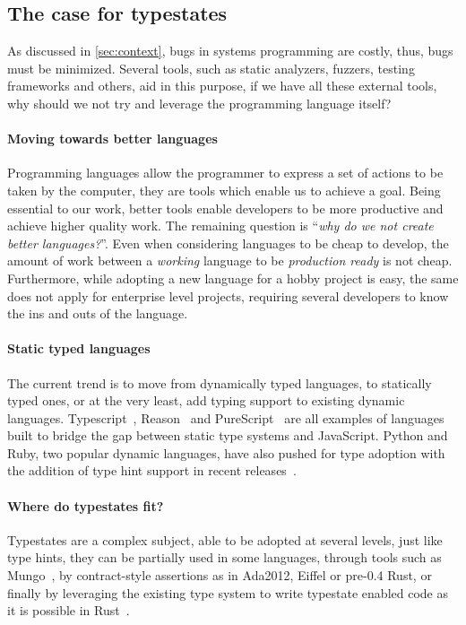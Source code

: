 \subsection{The case for typestates}

As discussed in \autoref{sec:context}, bugs in systems programming are costly,
thus, bugs must be minimized.
Several tools, such as static analyzers, fuzzers, testing frameworks and others,
aid in this purpose, if we have all these external tools,
why should we not try and leverage the programming language itself?

\paragraph{Moving towards better languages}
Programming languages allow the programmer to express a set of actions to be taken by the computer,
they are tools which enable us to achieve a goal.
Being essential to our work, better tools enable developers to be more productive and achieve higher quality work.
The remaining question is “\emph{why do we not create better languages?}”.
Even when considering languages to be cheap to develop,
the amount of work between a \emph{working} language to be \emph{production ready} is not cheap.
Furthermore, while adopting a new language for a hobby project is easy,
the same does not apply for enterprise level projects,
requiring several developers to know the ins and outs of the language.

\paragraph{Static typed languages}
The current trend is to move from dynamically typed languages,
to statically typed ones, or at the very least, add typing support to existing dynamic languages.
Typescript~\autocite{typescript},
Reason~\autocite{reason} and
PureScript~\autocite{purescript}
are all examples of languages built to bridge the gap between static type systems and JavaScript.
Python and Ruby, two popular dynamic languages, have also pushed for type adoption
with the addition of type hint support in recent
releases~\autocite{PythonTyping, RubyRBS}.

\paragraph{Where do typestates fit?}
Typestates are a complex subject, able to be adopted at several levels,
just like type hints, they can be partially used in some languages,
through tools such as Mungo~\autocite{Voinea2020},
by contract-style assertions as in Ada2012, Eiffel or pre-0.4 Rust,
or finally by leveraging the existing type system to write typestate enabled code as it is possible in
Rust~\autocite{Duarte2020}.

